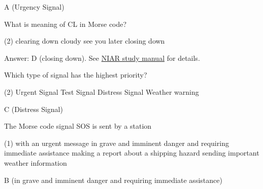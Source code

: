 \documentclass[a4paper]{article}
\begin{document}
\begin{solution}
	A (Urgency Signal)
\end{solution}

\vspace{5mm}



\begin{question}What is meaning of \apostrophe{}CL\apostrophe{} in Morse code?
	\begin{tasks}(2)
		\task clearing down
		\task cloudy
		\task see you later
		\task closing down
	\end{tasks}
\end{question}

\begin{solution}
	Answer: D (closing down). See \href{http://www.niar.org/downloads/ham-downloads/Study-Manual.pdf}{NIAR study manual} for details.
\end{solution}

\vspace{5mm}



\begin{question}Which type of signal has the highest priority?
	\begin{tasks}(2)
		\task Urgent Signal
		\task Test Signal
		\task Distress Signal
		\task Weather warning
	\end{tasks}
\end{question}

\begin{solution}
	C (Distress Signal)
\end{solution}

\vspace{5mm}



\begin{question}The Morse code signal SOS is sent by a station
	\begin{tasks}(1)
		\task with an urgent message
		\task in grave and imminent danger and requiring immediate assistance
		\task making a report about a shipping hazard
		\task sending important weather information
	\end{tasks}
\end{question}

\begin{solution}
	B (in grave and imminent danger and requiring immediate assistance)
\end{solution}

\vspace{5mm}
\end{document}
